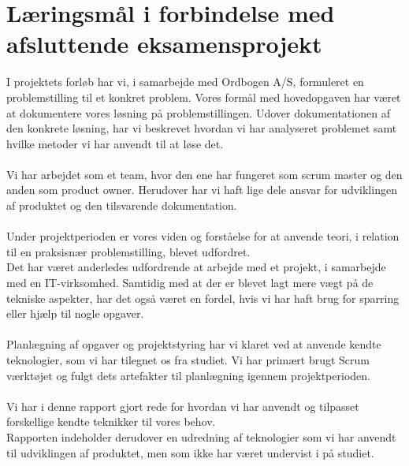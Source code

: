\section{Læringsmål i forbindelse med afsluttende eksamensprojekt}
I projektets forløb har vi, i samarbejde med Ordbogen A/S, formuleret en problemstilling til et konkret problem.
Vores formål med hovedopgaven har været at dokumentere vores løsning på problemstillingen.
Udover dokumentationen af den konkrete løsning, har vi beskrevet hvordan vi har analyseret problemet samt
hvilke metoder vi har anvendt til at løse det.
\\\\
Vi har arbejdet som et team, hvor den ene har fungeret som scrum master og den anden som product owner.
Herudover har vi haft lige dele ansvar for udviklingen af produktet og den tilsvarende dokumentation.
\\\\
Under projektperioden er vores viden og forståelse for at anvende teori, i relation til en praksisnær problemstilling, blevet udfordret.
\\
Det har været anderledes udfordrende at arbejde med et projekt, i samarbejde med en IT-virksomhed.
Samtidig med at der er blevet lagt mere vægt på de tekniske aspekter, har det også været en fordel, hvis vi har haft brug for sparring eller hjælp til nogle opgaver.
\\\\
Planlægning af opgaver og projektstyring har vi klaret ved at anvende kendte teknologier, som vi har tilegnet os fra studiet.
Vi har primært brugt Scrum værktøjet og fulgt dets artefakter til planlægning igennem projektperioden.
\\\\
Vi har i denne rapport gjort rede for hvordan vi har anvendt og tilpasset forskellige kendte teknikker til vores behov.
\\
Rapporten indeholder derudover en udredning af teknologier som vi har anvendt til udviklingen af produktet, men som ikke har været undervist i på studiet.
